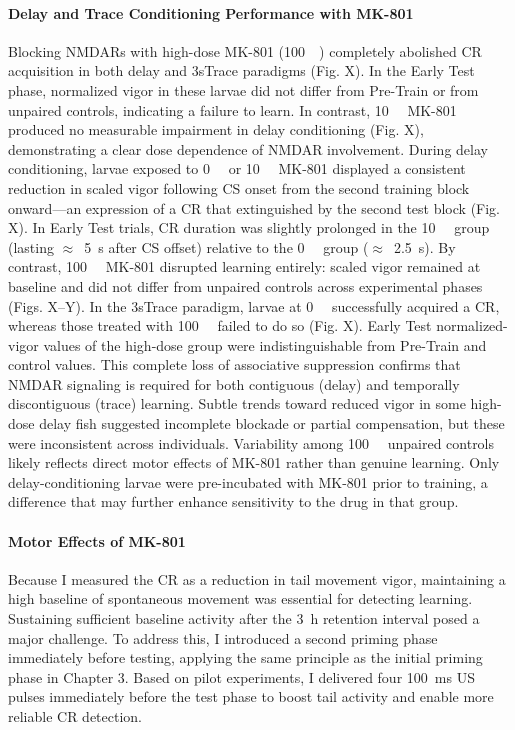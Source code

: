 \paragraph{Delay and Trace Conditioning Performance with MK-801}
Blocking NMDARs with high-dose MK-801 (100~\si{\micro\Molar}) completely abolished CR acquisition in both delay and 3sTrace paradigms (Fig. X). In the Early Test phase, normalized vigor in these larvae did not differ from Pre-Train or from unpaired controls, indicating a failure to learn. In contrast, 10~\si{\micro\Molar} MK-801 produced no measurable impairment in delay conditioning (Fig. X), demonstrating a clear dose dependence of NMDAR involvement.
During delay conditioning, larvae exposed to 0~\si{\micro\Molar} or 10~\si{\micro\Molar} MK-801 displayed a consistent reduction in scaled vigor following CS onset from the second training block onward—an expression of a CR that extinguished by the second test block (Fig. X). In Early Test trials, CR duration was slightly prolonged in the 10~\si{\micro\Molar} group (lasting $\approx$~5~s after CS offset) relative to the 0~\si{\micro\Molar} group ($\approx$~2.5~s). By contrast, 100~\si{\micro\Molar} MK-801 disrupted learning entirely: scaled vigor remained at baseline and did not differ from unpaired controls across experimental phases (Figs. X--Y).
In the 3sTrace paradigm, larvae at 0~\si{\micro\Molar} successfully acquired a CR, whereas those treated with 100~\si{\micro\Molar} failed to do so (Fig. X). Early Test normalized-vigor values of the high-dose group were indistinguishable from Pre-Train and control values. This complete loss of associative suppression confirms that NMDAR signaling is required for both contiguous (delay) and temporally discontiguous (trace) learning.
Subtle trends toward reduced vigor in some high-dose delay fish suggested incomplete blockade or partial compensation, but these were inconsistent across individuals. Variability among 100~\si{\micro\Molar} unpaired controls likely reflects direct motor effects of MK-801 rather than genuine learning. Only delay-conditioning larvae were pre-incubated with MK-801 prior to training, a difference that may further enhance sensitivity to the drug in that group.

\paragraph{Motor Effects of MK-801}
Because I measured the CR as a reduction in tail movement vigor, maintaining a high baseline of spontaneous movement was essential for detecting learning. Sustaining sufficient baseline activity after the \SI{3}{\hour} retention interval posed a major challenge. To address this, I introduced a second priming phase immediately before testing, applying the same principle as the initial priming phase in Chapter 3. Based on pilot experiments, I delivered four \SI{100}{\milli\second} US pulses immediately before the test phase to boost tail activity and enable more reliable CR detection.

